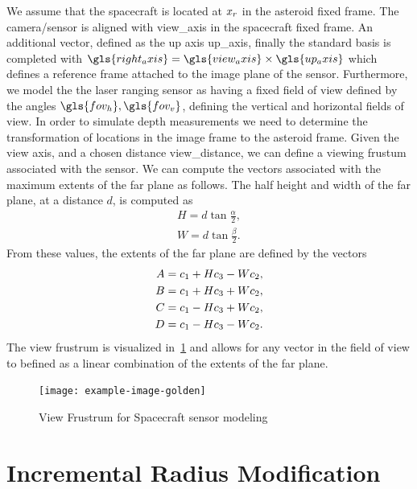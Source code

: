 We assume that the spacecraft is located at \(x_r\) in the asteroid fixed frame.
The camera/sensor is aligned with \gls{view_axis} in the spacecraft fixed frame.
An additional vector, defined as the up axis \gls{up_axis}, finally the standard basis is completed with \(  \gls{right_axis} = \gls{view_axis} \times \gls{up_axis} \) which defines a reference frame attached to the image plane of the sensor.
Furthermore, we model the the laser ranging sensor as having a fixed field of view defined by the angles \( \gls{fov_h}, \gls{fov_v}\), defining the vertical and horizontal fields of view.
In order to simulate depth measurements we need to determine the transformation of locations in the image frame to the asteroid frame. 
Given the view axis, and a chosen distance \gls{view_distance}, we can define a viewing \gls{frustum} associated with the sensor. 
We can compute the vectors associated with the maximum extents of the far plane as follows.
The half height and width of the far plane, at a distance \( d \), is computed as
\begin{align*}
    H = d \tan \frac{\alpha}{2} , \\
    W = d \tan \frac{\beta}{2} .
\end{align*}
From these values, the extents of the far plane are defined by the vectors
\begin{align*}
    A = c_1 + H c_3 - W c_2 , \\
    B = c_1 + H c_3 + W c_2, \\
    C = c_1 - H c_3 + W c_2, \\
    D = c_1 - H c_3 - W c_2.
\end{align*}
The view frustrum is visualized in~\cref{fig:view_frustrum} and allows for any vector in the field of view to befined as a linear combination of the extents of the far plane.
\begin{figure}[htbp]
    \centering
    \texttt{[image: example-image-golden]}
    \caption{View Frustrum for Spacecraft sensor modeling\label{fig:view_frustrum}}
\end{figure}

\section{Incremental Radius Modification}\label{sec:radius_update}

